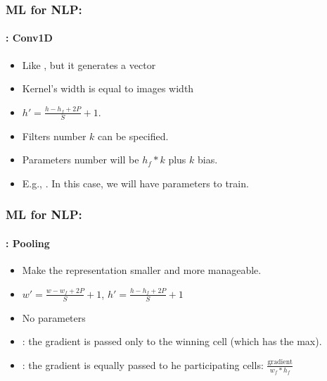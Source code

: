 \documentclass[xcolor=table]{beamer}
\begin{document}
	\begin{frame}
		\frametitle{ML for NLP: \insertsection}
		\framesubtitle{\insertsubsection: Conv1D}
		
		\begin{minipage}{0.60\textwidth} 
			\begin{itemize}
				\item Like , but it generates a vector
				\item Kernel's width is equal to images width
				\item $ h' = \frac{h - h_f + 2P}{S} + 1$.
				\item Filters number $k$ can be specified.
				\item Parameters number will be $h_f * k$ plus $k$ bias.
				\item E.g., . In this case, we will have  parameters to train.
			\end{itemize}
		\end{minipage}
		\begin{minipage}{0.39\textwidth}
		\end{minipage}
		
	\end{frame}
	
	\begin{frame}
		\frametitle{ML for NLP: \insertsection}
		\framesubtitle{\insertsubsection: Pooling}
		
		\begin{minipage}{0.60\textwidth} 
			\begin{itemize}
				\item Make the representation smaller and more manageable.
				\item $ w' = \frac{w - w_f + 2P}{S} + 1$,  $ h' = \frac{h - h_f + 2P}{S} + 1$
				\item No parameters 
				\item {}: the gradient is passed only to the winning cell (which has the max).
				\item {}: the gradient is equally passed to he participating cells: $\frac{\text{gradient}}{w_f * h_f}$ 
			\end{itemize}
		\end{minipage}
		\begin{minipage}{0.39\textwidth}
			\hgraphpage[\textwidth]{maxpool.pdf}
		\end{minipage}
		
	\end{frame}
	
\end{document}
